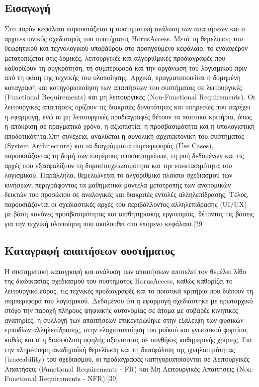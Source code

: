 \documentclass[twoside, a4paper, 11pt]{article}
\begin{document}
\subsection{Εισαγωγή}
​Στο παρόν κεφάλαιο παρουσιάζεται η συστηματική ανάλυση των απαιτήσεων και ο αρχιτεκτονικός σχεδιασμός του συστήματος HorusAccess. Μετά τη θεμελίωση του θεωρητικού και τεχνολογικού υποβάθρου στο προηγούμενο κεφάλαιο, το ενδιαφέρον μετατοπίζεται στις δομικές, λειτουργικές και αλγοριθμικές προδιαγραφές που καθορίζουν τη συγκρότηση, τη συμπεριφορά και την οργάνωση του λογισμικού πριν από τη φάση της τεχνικής του υλοποίησης.
​Αρχικά, πραγματοποιείται η δομημένη καταγραφή και κατηγοριοποίηση των απαιτήσεων του συστήματος σε λειτουργικές (Functional Requirements) και μη λειτουργικές (Non-Functional Requirements). Οι λειτουργικές απαιτήσεις ορίζουν τις διακριτές δυνατότητες και υπηρεσίες που παρέχει η εφαρμογή, ενώ οι μη λειτουργικές προδιαγραφές θέτουν τα ποιοτικά κριτήρια, όπως η απόκριση σε πραγματικό χρόνο, η αξιοπιστία, η προσβασιμότητα και η υπολογιστική αποδοτικότητα.
​Στη συνέχεια, αναλύεται η συνολική αρχιτεκτονική του συστήματος (System Architecture) και τα διαγράμματα συμπεριφοράς (Use Cases), παρουσιάζοντας τη δομή των επιμέρους υποσυστημάτων, τη ροή δεδομένων και τις αρχές που εξασφαλίζουν τη δομοστοιχειωσιμότητα και την επεκτασιμότητα του λογισμικού. Παράλληλα, θεμελιώνεται το αλγοριθμικό πλαίσιο σχεδιασμού των κινήσεων, περιγράφοντας τα μαθηματικά μοντέλα μετατροπής των ανατομικών δεικτών του προσώπου σε αναλογικές και διακριτές εντολές αλληλεπίδρασης. Τέλος, παρουσιάζονται οι σχεδιαστικές αρχές του περιβάλλοντος αλληλεπίδρασης (UI/UX) με βάση κανόνες προσβασιμότητας και αισθητηριακής εργονομίας, θέτοντας τις βάσεις για την τεχνική υλοποίηση που ακολουθεί στο επόμενο κεφάλαιο.[29]

\subsection{Καταγραφή απαιτήσεων συστήματος}
​Η συστηματική καταγραφή και ανάλυση των απαιτήσεων αποτελεί τον θεμέλιο λίθο της διαδικασίας σχεδιασμού του συστήματος HorusAccess, 
καθώς καθορίζει το λειτουργικό εύρος, τις τεχνικές προδιαγραφές και τα ποιοτικά κριτήρια που διέπουν τη συμπεριφορά του λογισμικού. 
Δεδομένου ότι η εφαρμογή σχεδιάστηκε με πρωταρχικό στόχο την παροχή πλήρους ψηφιακής αυτονομίας σε άτομα με σοβαρές κινητικές αναπηρίες, 
η συλλογή των απαιτήσεων επικεντρώθηκε στην εξάλειψη των φυσικών εμποδίων αλληλεπίδρασης, στην ελαχιστοποίηση του μυϊκού και γνωστικού φορτίου, καθώς και στη διασφάλιση υψηλής αξιοπιστίας σε συνθήκες καθημερινής χρήσης. 
Για την πληρέστερη ακαδημαϊκή θεμελίωση και τη διασφάλιση της ιχνηλασιμότητας (traceability) του σχεδιασμού, οι προδιαγραφές κατηγοριοποιούνται σε Λειτουργικές Απαιτήσεις (Functional Requirements - FR) και Μη Λειτουργικές Απαιτήσεις (Non-Functional Requirements - NFR).[39]
\end{document}
